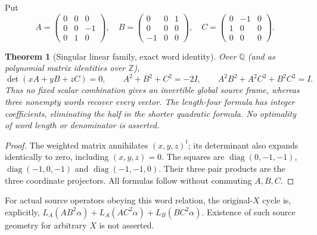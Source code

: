 \documentclass[11pt]{article}
\newtheorem{theorem}{Theorem}
\newcommand{\Q}{\mathbb Q}\newcommand{\Z}{\mathbb Z}
\begin{document}
Put
\[
 A=\begin{pmatrix}0&0&0\\0&0&-1\\0&1&0\end{pmatrix},\quad
 B=\begin{pmatrix}0&0&1\\0&0&0\\-1&0&0\end{pmatrix},\quad
 C=\begin{pmatrix}0&-1&0\\1&0&0\\0&0&0\end{pmatrix}.
\]
\begin{theorem}[Singular linear family, exact word identity]
Over $\Q$ (and as polynomial matrix identities over $\Z$),
\[
 \det(xA+yB+zC)=0,\qquad A^2+B^2+C^2=-2I,
 \qquad A^2B^2+A^2C^2+B^2C^2=I.
\]
Thus no fixed scalar combination gives an invertible global source frame,
whereas three nonempty words recover every vector. The length-four formula
has integer coefficients, eliminating the half in the shorter quadratic
formula. No optimality of word length or denominator is asserted.
\end{theorem}
\begin{proof}
The weighted matrix annihilates $(x,y,z)^t$; its determinant also expands
identically to zero, including $(x,y,z)=0$.
The squares are $\operatorname{diag}(0,-1,-1)$,
$\operatorname{diag}(-1,0,-1)$ and
$\operatorname{diag}(-1,-1,0)$.
Their three pair products are the three coordinate projectors.
All formulas follow without commuting $A,B,C$.
\end{proof}
For actual source operators obeying this word relation, the original-$X$
cycle is, explicitly,
$L_A(AB^2\alpha)+L_A(AC^2\alpha)+L_B(BC^2\alpha)$.
Existence of such source geometry for arbitrary $X$ is not asserted.
\end{document}
